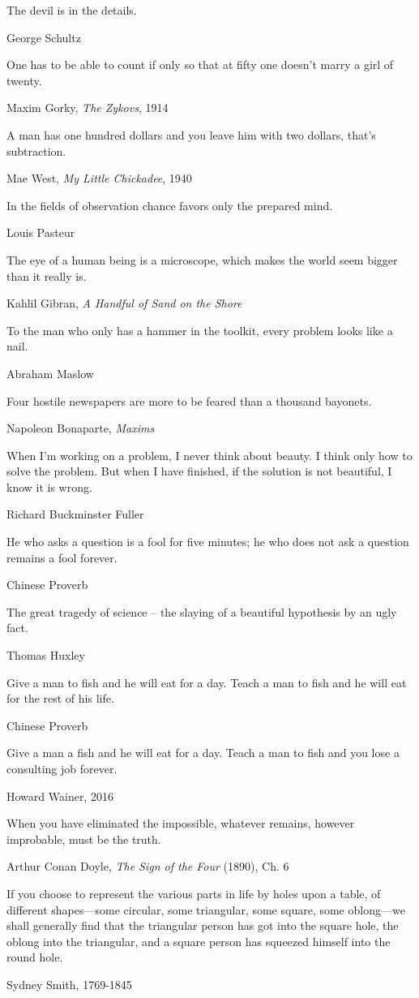 \epigraph{The devil is in the details.}{George Schultz} %

\epigraph{One has to be able to count if only so that at fifty one doesn't marry a girl of twenty.}{Maxim Gorky, \emph{The Zykovs}, 1914}

\epigraph{A man has one hundred dollars and you leave him with two dollars, that's subtraction.}{Mae West, \emph{My Little Chickadee}, 1940}

\epigraph{In the fields of observation chance favors only the prepared mind.}{Louis Pasteur}

\epigraph{The eye of a human being is a microscope, which makes the world seem bigger than it really is.}{Kahlil Gibran, \emph{A Handful of Sand on the Shore}}

\epigraph{To the man who only has a hammer in the toolkit, every problem looks like a nail.}{Abraham Maslow}

\epigraph{Four hostile newspapers are more to be feared than a thousand bayonets.}{Napoleon Bonaparte, \emph{Maxims}}

\epigraph{When I'm working on a problem, I never think about beauty. I think only how to solve the problem. But when I have finished, if the solution is not beautiful, I know it is wrong.}{Richard Buckminster Fuller}

\epigraph{He who asks a question is a fool for five minutes; he who does not ask a question remains a fool forever.}{Chinese Proverb}

\epigraph{The great tragedy of science -- the slaying of a beautiful hypothesis by an ugly fact.}{Thomas Huxley}

\epigraph{Give a man to fish and he will eat for a day. Teach a man to fish and he will eat for the rest of his life.}{Chinese Proverb}

\epigraph{Give a man a fish and he will eat for a day. Teach a man to fish and you lose a consulting job forever.}{Howard Wainer, 2016}

\epigraph{When you have eliminated the impossible, whatever remains, however improbable, must be the truth.}{Arthur Conan Doyle, \emph{The Sign of the Four} (1890), Ch. 6}

\epigraph{If you choose to represent the various parts in life by holes upon a table, of different shapes---some circular, some triangular, some square, some oblong---we shall generally find that the triangular person has got into the square hole, the oblong into the triangular, and a square person has squeezed himself into the round hole.}{Sydney Smith, 1769-1845}


